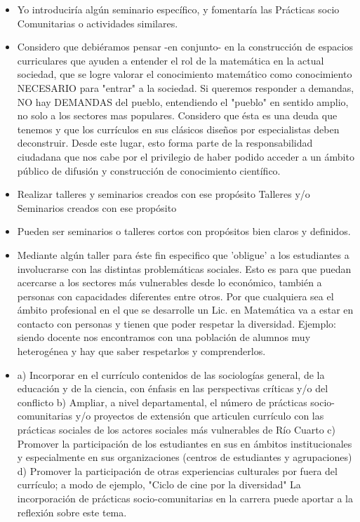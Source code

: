 \documentclass[a4paper,10pt,BCOR10mm,oneside,headsepline]{scrbook}
\begin{document}
\begin{subappendices}
\begin{itemize}
 \item Yo introduciría algún seminario específico, y fomentaría las Prácticas socio Comunitarias o actividades similares. 
 
 \item Considero que debiéramos pensar -en conjunto- en la construcción de espacios curriculares que ayuden a entender el rol de la matemática en la actual sociedad, que se logre valorar el conocimiento matemático como conocimiento NECESARIO  para "entrar" a la sociedad. Si queremos responder a demandas, NO hay DEMANDAS del pueblo, entendiendo el "pueblo"  en sentido amplio, no solo  a los sectores mas populares.  Considero que ésta es una deuda que tenemos y que los currículos en sus clásicos diseños por especialistas deben deconstruir.  Desde este lugar, esto forma parte de la responsabilidad ciudadana que nos cabe por  el privilegio de haber podido acceder a un ámbito público de difusión y construcción de conocimiento científico. 
 
 \item Realizar talleres y seminarios creados con ese propósito
Talleres y/o Seminarios creados con ese propósito

 \item Pueden ser seminarios o talleres cortos con propósitos bien claros y definidos.
 
 \item Mediante algún taller para éste fin especifico que 'obligue' a los estudiantes a involucrarse con las distintas problemáticas sociales.  Esto es para que puedan acercarse  a los sectores más vulnerables desde lo económico, también a personas con capacidades diferentes entre otros. Por que cualquiera sea el ámbito profesional en el que se desarrolle un Lic. en Matemática va a estar en contacto con personas y tienen que poder respetar la diversidad. Ejemplo: siendo docente nos  encontramos con una población de alumnos muy heterogénea y hay que saber respetarlos y comprenderlos.
 
\item a) Incorporar en el currículo contenidos de las sociologías general, de la educación y de la ciencia,  con énfasis en las perspectivas críticas y/o del conflicto b) Ampliar, a nivel departamental, el número de prácticas socio-comunitarias y/o proyectos de extensión 
que articulen currículo con las prácticas sociales de los actores sociales más vulnerables de Río Cuarto c) Promover la participación de los estudiantes en sus en ámbitos institucionales y especialmente en sus organizaciones (centros de estudiantes y agrupaciones)  d) Promover la participación de otras experiencias culturales por fuera del currículo; a modo de ejemplo, "Ciclo de cine por la diversidad" 
La incorporación de prácticas socio-comunitarias en la carrera puede aportar a la reflexión sobre este tema.


\end{itemize}
\end{subappendices}
\end{document}
